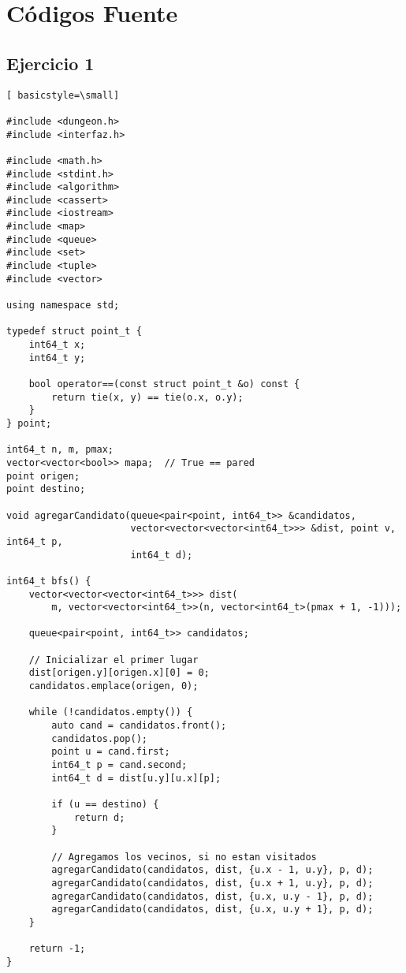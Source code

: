 \section{Códigos Fuente}
\subsection{Ejercicio 1}


\begin{lstlisting}[ basicstyle=\small]

#include <dungeon.h>
#include <interfaz.h>

#include <math.h>
#include <stdint.h>
#include <algorithm>
#include <cassert>
#include <iostream>
#include <map>
#include <queue>
#include <set>
#include <tuple>
#include <vector>

using namespace std;

typedef struct point_t {
    int64_t x;
    int64_t y;

    bool operator==(const struct point_t &o) const {
        return tie(x, y) == tie(o.x, o.y);
    }
} point;

int64_t n, m, pmax;
vector<vector<bool>> mapa;  // True == pared
point origen;
point destino;

void agregarCandidato(queue<pair<point, int64_t>> &candidatos,
                      vector<vector<vector<int64_t>>> &dist, point v, int64_t p,
                      int64_t d);

int64_t bfs() {
    vector<vector<vector<int64_t>>> dist(
        m, vector<vector<int64_t>>(n, vector<int64_t>(pmax + 1, -1)));

    queue<pair<point, int64_t>> candidatos;

    // Inicializar el primer lugar
    dist[origen.y][origen.x][0] = 0;
    candidatos.emplace(origen, 0);

    while (!candidatos.empty()) {
        auto cand = candidatos.front();
        candidatos.pop();
        point u = cand.first;
        int64_t p = cand.second;
        int64_t d = dist[u.y][u.x][p];

        if (u == destino) {
            return d;
        }

        // Agregamos los vecinos, si no estan visitados
        agregarCandidato(candidatos, dist, {u.x - 1, u.y}, p, d);
        agregarCandidato(candidatos, dist, {u.x + 1, u.y}, p, d);
        agregarCandidato(candidatos, dist, {u.x, u.y - 1}, p, d);
        agregarCandidato(candidatos, dist, {u.x, u.y + 1}, p, d);
    }

    return -1;
}
\end{lstlisting}
